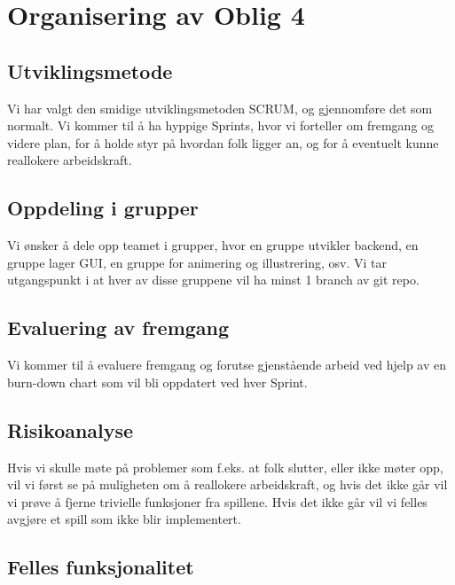 \documentclass[12pt]{report}
\begin{document}

\section*{Organisering av Oblig 4}

\subsection*{Utviklingsmetode}

Vi har valgt den smidige utviklingsmetoden SCRUM, og gjennomf{\o}re det som normalt. 
Vi kommer til {\aa} ha hyppige Sprints, hvor vi forteller om fremgang og videre plan, 
for {\aa} holde styr p{\aa} hvordan folk ligger an, og for {\aa} eventuelt kunne reallokere arbeidskraft.

\subsection*{Oppdeling i grupper}

Vi {\o}nsker {\aa} dele opp teamet i grupper, hvor en gruppe utvikler backend, en gruppe lager GUI, en gruppe for animering og illustrering, osv.
Vi tar utgangspunkt i at hver av disse gruppene vil ha minst 1 branch av git repo.

\subsection*{Evaluering av fremgang}

Vi kommer til {\aa} evaluere fremgang og forutse gjenst{\aa}ende arbeid 
ved hjelp av en burn-down chart som vil bli oppdatert ved hver Sprint.

\subsection*{Risikoanalyse}

Hvis vi skulle m{\o}te p{\aa} problemer som f.eks. at folk slutter, eller ikke m{\o}ter opp, 
vil vi f{\o}rst se p{\aa} muligheten om {\aa} reallokere arbeidskraft, 
og hvis det ikke g{\aa}r vil vi pr{\o}ve {\aa} fjerne trivielle funksjoner fra spillene. 
Hvis det ikke g{\aa}r vil vi felles avgj{\o}re et spill som ikke blir implementert.

\subsection*{Felles funksjonalitet}
\end{document}
